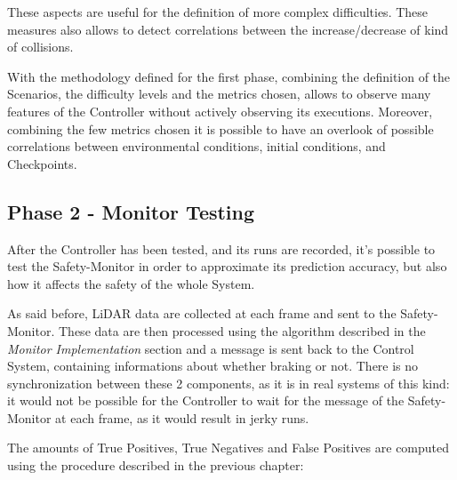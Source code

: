 These aspects are useful for the definition of more complex difficulties. These measures also allows to detect correlations between the increase/decrease of kind of collisions.\newline

With the methodology defined for the first phase, combining the definition of the Scenarios, the difficulty levels and the metrics chosen, allows to observe many features of the Controller without actively observing its executions. Moreover, combining the few metrics chosen it is possible to have an overlook of possible correlations between environmental conditions, initial conditions, and Checkpoints.

\subsection{Phase 2 - Monitor Testing}

After the Controller has been tested, and its runs are recorded, it's possible to test the Safety-Monitor in order to approximate its prediction accuracy, but also how it affects the safety of the whole System.

As said before, LiDAR data are collected at each frame and sent to the Safety-Monitor. These data are then processed using the algorithm described in the \textsl{Monitor Implementation} section and a message is sent back to the Control System, containing informations about whether braking or not. There is no synchronization between these 2 components, as it is in real systems of this kind: it would not be possible for the Controller to wait for the message of the Safety-Monitor at each frame, as it would result in jerky runs.

The amounts of True Positives, True Negatives and False Positives are computed using the procedure described in the previous chapter:

